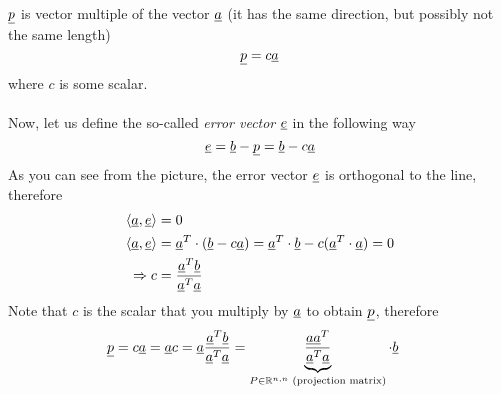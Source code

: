 \begin{center}

\end{center}
$\underline{p}$ is vector multiple of the vector $\underline{a}$ (it has the same direction, but possibly not the same length) $$\underline{p} = c\underline{a}$$ where $c$ is some scalar. \\ \\
Now, let us define the so-called \textit{error vector} \textcolor{green}{$\underline{e}$} in the following way $$\underline{e} = \underline{b}-\underline{p} = \underline{b} -c\underline{a}$$ As you can see from the picture, the error vector $\underline{e}$ is orthogonal to the line, therefore 
\begin{align*}
\langle\underline{a},\underline{e} \rangle &= 0\\
\langle\underline{a},\underline{e} \rangle &=\underline{a}^T \cdot (\underline{b}-c\underline{a}) = \underline{a}^T\cdot  \underline{b} - c(\underline{a}^T\cdot \underline{a}) = 0\\
\Rightarrow c &= \frac{\underline{a}^T\underline{b}}{\underline{a}^T\underline{a}}\\
\end{align*}
Note that $c$ is the scalar that you multiply by $\underline{a}$ to obtain $\underline{p}$, therefore
\begin{align*}
\underline{p} &= c\underline{a} = \underline{a}c = \underline{a}\frac{\underline{a}^T\underline{b}}{\underline{a}^T\underline{a}} = \underbrace{\frac{\underline{a}\underline{a}^T}{\underline{a}^T\underline{a}}}_{P\in\mathbb{R}^{n,n}\text{ (projection matrix)}}\cdot\underline{b}
\end{align*}
